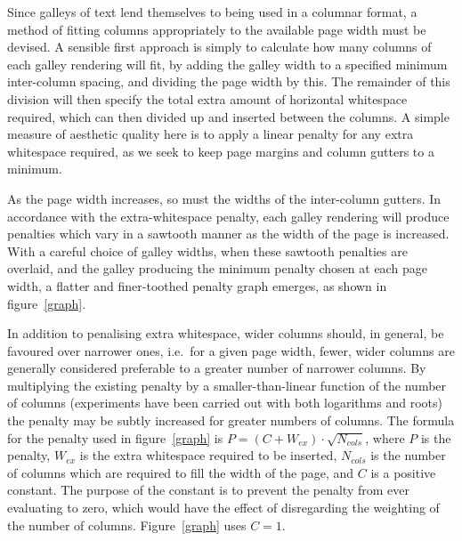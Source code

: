 Since galleys of text lend themselves to being used in a columnar format, a method of fitting
columns appropriately to the available page width must be devised. A sensible first approach is
simply to calculate how many columns of each galley rendering will fit, by adding the galley width
to a specified minimum inter-column spacing, and dividing the page width by this. The remainder of
this division will then specify the total extra amount of horizontal whitespace required, which can
then divided up and inserted between the columns. A simple measure of aesthetic quality here is to
apply a linear penalty for any extra whitespace required, as we seek to keep page margins and column
gutters to a minimum.

As the page width increases, so must the widths of the inter-column gutters. In accordance with the
extra-whitespace penalty, each galley rendering will produce penalties which vary in a sawtooth
manner as the width of the page is increased. With a careful choice of galley widths, when these
sawtooth penalties are overlaid, and the galley producing the minimum penalty chosen at each page
width, a flatter and finer-toothed penalty graph emerges, as shown in figure~\ref{graph}.

In addition to penalising extra whitespace, wider columns should, in general, be favoured over
narrower ones, i.e.~for a given page width, fewer, wider columns are generally considered preferable
to a greater number of narrower columns. By multiplying the existing penalty by a
smaller-than-linear function of the number of columns (experiments have been carried out with both
logarithms and roots) the penalty may be subtly increased for greater numbers of columns. The
formula for the penalty used in figure~\ref{graph} is $P = (C + W_{ex})\cdot\sqrt{N_{cols}}$, where
$P$ is the penalty, $W_{ex}$ is the extra whitespace required to be inserted, $N_{cols}$ is the
number of columns which are required to fill the width of the page, and $C$ is a positive constant.
The purpose of the constant is to prevent the penalty from ever evaluating to zero, which would have
the effect of disregarding the weighting of the number of columns. Figure~\ref{graph} uses $C=1$.


